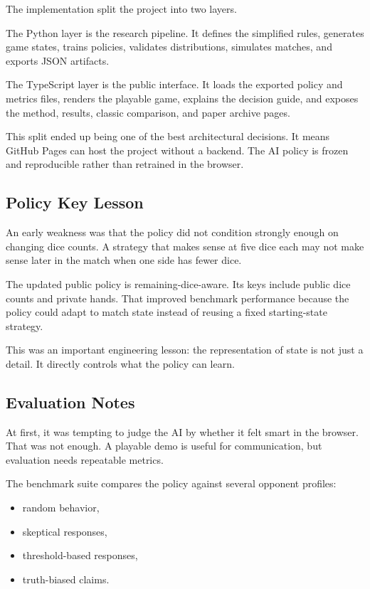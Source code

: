 \documentclass[
]{article}
\providecommand{\tightlist}{%
  \setlength{\itemsep}{0pt}\setlength{\parskip}{0pt}}
\begin{document}
The implementation split the project into two layers.

The Python layer is the research pipeline. It defines the simplified
rules, generates game states, trains policies, validates distributions,
simulates matches, and exports JSON artifacts.

The TypeScript layer is the public interface. It loads the exported
policy and metrics files, renders the playable game, explains the
decision guide, and exposes the method, results, classic comparison, and
paper archive pages.

This split ended up being one of the best architectural decisions. It
means GitHub Pages can host the project without a backend. The AI policy
is frozen and reproducible rather than retrained in the browser.

\subsection{Policy Key Lesson}\label{policy-key-lesson}

An early weakness was that the policy did not condition strongly enough
on changing dice counts. A strategy that makes sense at five dice each
may not make sense later in the match when one side has fewer dice.

The updated public policy is remaining-dice-aware. Its keys include
public dice counts and private hands. That improved benchmark
performance because the policy could adapt to match state instead of
reusing a fixed starting-state strategy.

This was an important engineering lesson: the representation of state is
not just a detail. It directly controls what the policy can learn.

\subsection{Evaluation Notes}\label{evaluation-notes}

At first, it was tempting to judge the AI by whether it felt smart in
the browser. That was not enough. A playable demo is useful for
communication, but evaluation needs repeatable metrics.

The benchmark suite compares the policy against several opponent
profiles:

\begin{itemize}
\tightlist
\item
  random behavior,
\item
  skeptical responses,
\item
  threshold-based responses,
\item
  truth-biased claims.
\end{itemize}
\end{document}
